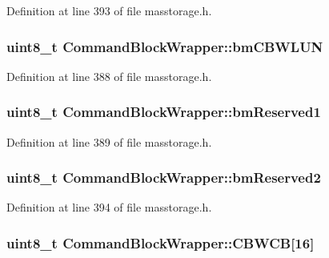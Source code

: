 \-Definition at line 393 of file masstorage.\-h.

\hypertarget{struct_command_block_wrapper_a2a16bb9a98e3ee4eaac8fea6310b4e01}{
\subsubsection[{bm\-C\-B\-W\-L\-U\-N}]{\setlength{\rightskip}{0pt plus 5cm}uint8\-\_\-t {\bf \-Command\-Block\-Wrapper\-::bm\-C\-B\-W\-L\-U\-N}}}\label{struct_command_block_wrapper_a2a16bb9a98e3ee4eaac8fea6310b4e01}


\-Definition at line 388 of file masstorage.\-h.

\hypertarget{struct_command_block_wrapper_a4954eacb2cd6d0ee7be475da3b46d907}{
\subsubsection[{bm\-Reserved1}]{\setlength{\rightskip}{0pt plus 5cm}uint8\-\_\-t {\bf \-Command\-Block\-Wrapper\-::bm\-Reserved1}}}\label{struct_command_block_wrapper_a4954eacb2cd6d0ee7be475da3b46d907}


\-Definition at line 389 of file masstorage.\-h.

\hypertarget{struct_command_block_wrapper_ac651509a5fc7789ba59d21fe94c55e77}{
\subsubsection[{bm\-Reserved2}]{\setlength{\rightskip}{0pt plus 5cm}uint8\-\_\-t {\bf \-Command\-Block\-Wrapper\-::bm\-Reserved2}}}\label{struct_command_block_wrapper_ac651509a5fc7789ba59d21fe94c55e77}


\-Definition at line 394 of file masstorage.\-h.

\hypertarget{struct_command_block_wrapper_a2f5feafb5e1c993454c1ccd14a17965a}{
\subsubsection[{\-C\-B\-W\-C\-B}]{\setlength{\rightskip}{0pt plus 5cm}uint8\-\_\-t {\bf \-Command\-Block\-Wrapper\-::\-C\-B\-W\-C\-B}\mbox{[}16\mbox{]}}}\label{struct_command_block_wrapper_a2f5feafb5e1c993454c1ccd14a17965a}



